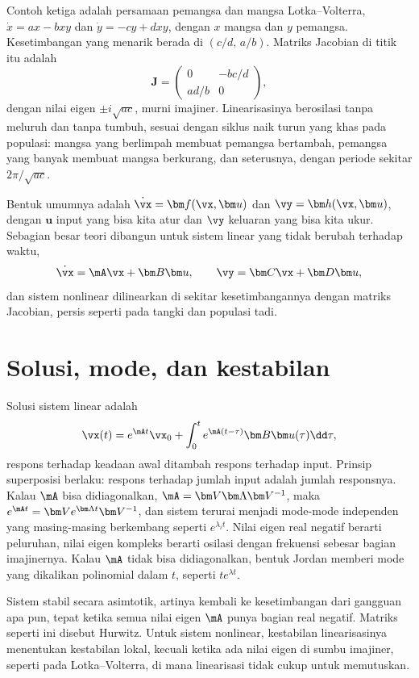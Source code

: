 Contoh ketiga adalah persamaan pemangsa dan mangsa Lotka--Volterra, $\dot x=ax-bxy$ dan $\dot y=-cy+dxy$, dengan
$x$ mangsa dan $y$ pemangsa. Kesetimbangan yang menarik berada di $(c/d,\,a/b)$. Matriks Jacobian di titik itu
adalah
\begin{equation}
\bm J=\begin{pmatrix}0&-bc/d\\ad/b&0\end{pmatrix},
\end{equation}
dengan nilai eigen $\pm i\sqrt{ac}$, murni imajiner. Linearisasinya berosilasi tanpa meluruh dan tanpa tumbuh,
sesuai dengan siklus naik turun yang khas pada populasi: mangsa yang berlimpah membuat pemangsa bertambah,
pemangsa yang banyak membuat mangsa berkurang, dan seterusnya, dengan periode sekitar $2\pi/\sqrt{ac}$.

Bentuk umumnya adalah $\dot{\vx}=\bm f(\vx,\bm u)$ dan $\vy=\bm h(\vx,\bm u)$, dengan $\bm u$ input yang bisa kita
atur dan $\vy$ keluaran yang bisa kita ukur. Sebagian besar teori dibangun untuk sistem linear yang tidak
berubah terhadap waktu,
\begin{equation}
\dot{\vx}=\mA\vx+\bm B\bm u,\qquad \vy=\bm C\vx+\bm D\bm u,
\end{equation}
dan sistem nonlinear dilinearkan di sekitar kesetimbangannya dengan matriks Jacobian, persis seperti
pada tangki dan populasi tadi.

\section{Solusi, mode, dan kestabilan}

Solusi sistem linear adalah
\begin{equation}
\vx(t)=e^{\mA t}\vx_0+\int_0^te^{\mA(t-\tau)}\bm B\bm u(\tau)\dd\tau,
\end{equation}
respons terhadap keadaan awal ditambah respons terhadap input. Prinsip superposisi berlaku: respons terhadap
jumlah input adalah jumlah responsnya. Kalau $\mA$ bisa didiagonalkan, $\mA=\bm V\bm\Lambda\bm V^{-1}$, maka
$e^{\mA t}=\bm Ve^{\bm\Lambda t}\bm V^{-1}$, dan sistem terurai menjadi mode-mode independen yang masing-masing
berkembang seperti $e^{\lambda_it}$. Nilai eigen real negatif berarti peluruhan, nilai eigen kompleks berarti
osilasi dengan frekuensi sebesar bagian imajinernya. Kalau $\mA$ tidak bisa didiagonalkan, bentuk Jordan
memberi mode yang dikalikan polinomial dalam $t$, seperti $te^{\lambda t}$.

Sistem stabil secara asimtotik, artinya kembali ke kesetimbangan dari gangguan apa pun, tepat ketika semua
nilai eigen $\mA$ punya bagian real negatif. Matriks seperti ini disebut Hurwitz. Untuk sistem nonlinear,
kestabilan linearisasinya menentukan kestabilan lokal, kecuali ketika ada nilai eigen di sumbu imajiner,
seperti pada Lotka--Volterra, di mana linearisasi tidak cukup untuk memutuskan.

